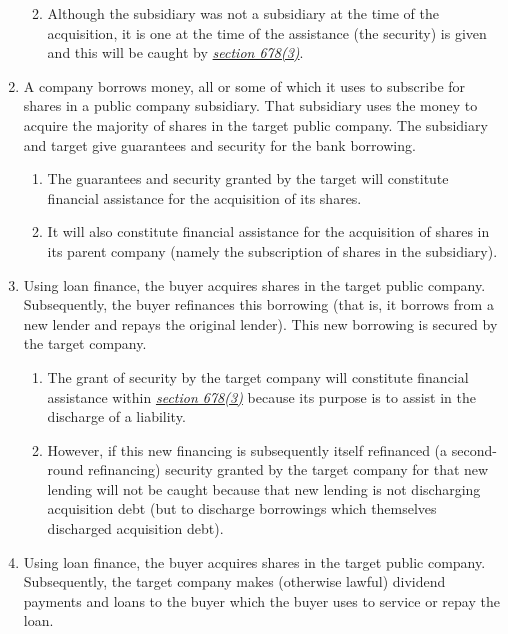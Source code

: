 \documentclass[
]{article}
\providecommand{\tightlist}{%
  \setlength{\itemsep}{0pt}\setlength{\parskip}{0pt}}
\begin{document}
\begin{enumerate}
  \begin{enumerate}
  \def\labelenumii{\arabic{enumii}.}
  \tightlist
  \item
    Although the subsidiary was not a subsidiary at the time of the
    acquisition, it is one at the time of the assistance (the security)
    is given and this will be caught by
    \emph{\href{https://uk.westlaw.com/5-505-7258?originationContext=document\&transitionType=PLDocumentLink\&contextData=(sc.Default)\&ppcid=fc9f4d9e83af4b4c8d47bf5847a3205c}{section
    678(3)}}.
  \end{enumerate}
\item
  A company borrows money, all or some of which it uses to subscribe for
  shares in a public company subsidiary. That subsidiary uses the money
  to acquire the majority of shares in the target public company. The
  subsidiary and target give guarantees and security for the bank
  borrowing.

  \begin{enumerate}
  \def\labelenumii{\arabic{enumii}.}
  \tightlist
  \item
    The guarantees and security granted by the target will constitute
    financial assistance for the acquisition of its shares.
  \item
    It will also constitute financial assistance for the acquisition of
    shares in its parent company (namely the subscription of shares in
    the subsidiary).
  \end{enumerate}
\item
  Using loan finance, the buyer acquires shares in the target public
  company. Subsequently, the buyer refinances this borrowing (that is,
  it borrows from a new lender and repays the original lender). This new
  borrowing is secured by the target company.

  \begin{enumerate}
  \def\labelenumii{\arabic{enumii}.}
  \tightlist
  \item
    The grant of security by the target company will constitute
    financial assistance within
    \emph{\href{https://uk.westlaw.com/5-505-7258?originationContext=document\&transitionType=PLDocumentLink\&contextData=(sc.Default)\&ppcid=fc9f4d9e83af4b4c8d47bf5847a3205c}{section
    678(3)}} because its purpose is to assist in the discharge of a
    liability.
  \item
    However, if this new financing is subsequently itself refinanced (a
    second-round refinancing) security granted by the target company for
    that new lending will not be caught because that new lending is not
    discharging acquisition debt (but to discharge borrowings which
    themselves discharged acquisition debt).
  \end{enumerate}
\item
  Using loan finance, the buyer acquires shares in the target public
  company. Subsequently, the target company makes (otherwise lawful)
  dividend payments and loans to the buyer which the buyer uses to
  service or repay the loan.


\end{enumerate}
\end{document}
